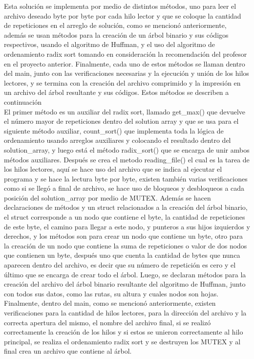 \documentclass[12pt, article, natbib]{IEEEtran}
\begin{document}
Esta solución se implementa por medio de distintos métodos, uno para leer el archivo deseado byte por byte por cada hilo lector y que se coloque la cantidad de repeticiones en el arreglo de solución, como se mencionó anteriormente, además se usan métodos para la creación de un árbol binario y sus códigos respectivos, usando el algoritmo de Huffman, y el uso del algoritmo de ordenamiento radix sort\cite{geeksforgeeks_2013_radix} tomando en consideración la recomendación del profesor en el proyecto anterior. Finalmente, cada uno de estos métodos se llaman dentro del main, junto con las verificaciones necesarias y la ejecución y unión de los hilos lectores, y se termina con la creación del archivo comprimido y la impresión en un archivo del árbol resultante y sus códigos. Estos métodos se describen a continuación\\

El primer método es un auxiliar del radix sort, llamado get\_max() que devuelve el número mayor de repeticiones dentro del solution array y que se usa para el siguiente método auxiliar, count\_sort() que implementa toda la lógica de ordenamiento usando arreglos auxiliares y colocando el resultado dentro del solution\_array, y luego está el método radix\_sort() que se encarga de unir ambos métodos auxiliares. Después se crea el metodo reading\_file() el cual es la tarea de los hilos lectores, aquí se hace uso del archivo que se indica al ejecutar el programa y se hace la lectura byte por byte, existen también varias verificaciones como si se llegó a final de archivo, se hace uso de bloqueos y desbloqueos a cada posición del solution\_array por medio de MUTEX. Además se hacen declaraciones de métodos y un struct relacionados a la creación del árbol binario, el struct corresponde a un nodo que contiene el byte, la cantidad de repeticiones de este byte, el camino para llegar a este nodo, y punteros a sus hijos izquierdos y derechos,  y los métodos son para crear un nodo que contiene un byte, otro para la creación de un nodo que contiene la suma de repeticiones o valor de dos nodos que contienen un byte, después uno que cuenta la cantidad de bytes que nunca aparecen dentro del archivo, es decir que su número de repetición es cero y el último que se encarga de crear todo el árbol. Luego, se declaran métodos para la creación del archivo del árbol binario resultante del algoritmo de Huffman, junto con todos sus datos, como las rutas, su altura y cuales nodos son hojas. Finalmente, dentro del main, como se mencionó anteriormente, existen verificaciones para la cantidad de hilos lectores, para la dirección del archivo y la correcta apertura del mismo, el nombre del archivo final, si se realizó correctamente la creación de los hilos y si estos se unieron correctamente al hilo principal, se realiza el ordenamiento radix sort y se destruyen los MUTEX y al final crea un archivo que contiene al árbol.\\
\end{document}
